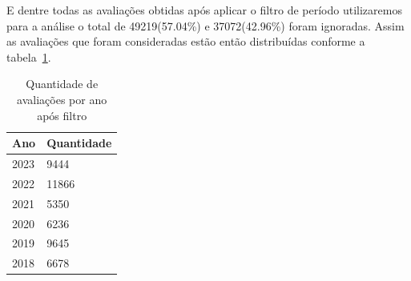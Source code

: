 E dentre todas as avaliações obtidas após aplicar o filtro de período utilizaremos para a análise o total de 49219(57.04\%) e 37072(42.96\%) foram ignoradas. Assim as avaliações que foram consideradas estão então distribuídas conforme a tabela~\ref{table:distribuicao_review_per_year}.

\begin{table}[h]
	\centering
	\begin{tabular}{|l|l|}
		\hline
		\textbf{Ano} & \textbf{Quantidade} \\\hline
		2023         & 9444                \\
		2022         & 11866               \\
		2021         & 5350                \\
		2020         & 6236                \\
		2019         & 9645                \\
		2018         & 6678                \\
		\hline
	\end{tabular}
	\caption{Quantidade de avaliações por ano após filtro}
	\label{table:distribuicao_review_per_year}
\end{table}


